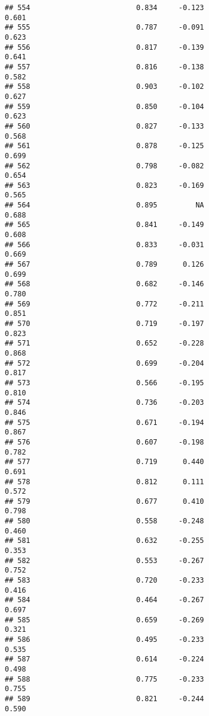 \documentclass[
]{article}
\begin{document}
\begin{verbatim}
## 554                         0.834     -0.123                     0.601
## 555                         0.787     -0.091                     0.623
## 556                         0.817     -0.139                     0.641
## 557                         0.816     -0.138                     0.582
## 558                         0.903     -0.102                     0.627
## 559                         0.850     -0.104                     0.623
## 560                         0.827     -0.133                     0.568
## 561                         0.878     -0.125                     0.699
## 562                         0.798     -0.082                     0.654
## 563                         0.823     -0.169                     0.565
## 564                         0.895         NA                     0.688
## 565                         0.841     -0.149                     0.608
## 566                         0.833     -0.031                     0.669
## 567                         0.789      0.126                     0.699
## 568                         0.682     -0.146                     0.780
## 569                         0.772     -0.211                     0.851
## 570                         0.719     -0.197                     0.823
## 571                         0.652     -0.228                     0.868
## 572                         0.699     -0.204                     0.817
## 573                         0.566     -0.195                     0.810
## 574                         0.736     -0.203                     0.846
## 575                         0.671     -0.194                     0.867
## 576                         0.607     -0.198                     0.782
## 577                         0.719      0.440                     0.691
## 578                         0.812      0.111                     0.572
## 579                         0.677      0.410                     0.798
## 580                         0.558     -0.248                     0.460
## 581                         0.632     -0.255                     0.353
## 582                         0.553     -0.267                     0.752
## 583                         0.720     -0.233                     0.416
## 584                         0.464     -0.267                     0.697
## 585                         0.659     -0.269                     0.321
## 586                         0.495     -0.233                     0.535
## 587                         0.614     -0.224                     0.498
## 588                         0.775     -0.233                     0.755
## 589                         0.821     -0.244                     0.590

\end{verbatim}
\end{document}
